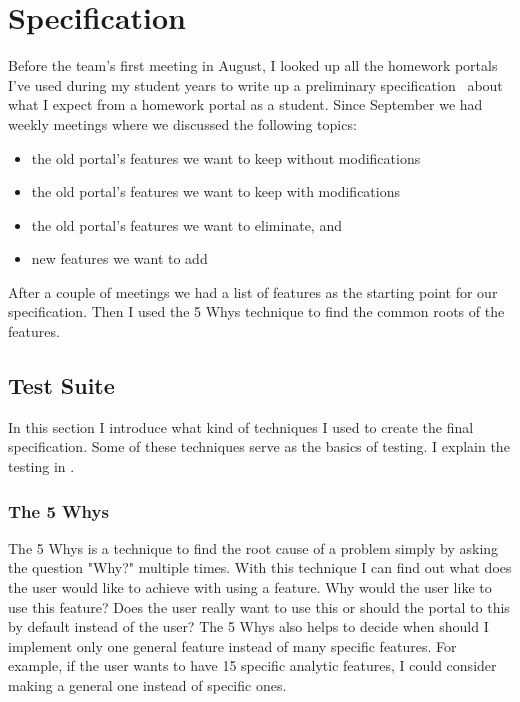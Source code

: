 \chapter{Specification}

Before the team's first meeting in August, I looked up all the homework portals I've used during my student years to write up a preliminary specification~\cite{Szepes-specification} about what I expect from a homework portal as a student. Since September we had weekly meetings where we discussed the following topics: 

\begin{itemize}
	\item the old portal's features we want to keep without modifications
	\item the old portal's features we want to keep with modifications
	\item the old portal's features we want to eliminate, and
	\item new features we want to add
\end{itemize}

After a couple of meetings we had a list of features as the starting point for our specification. Then I used the 5 Whys technique to find the common roots of the features. 

\section{Test Suite}
In this section I introduce what kind of techniques I used to create the final specification. Some of these techniques serve as the basics of testing. I explain the testing in . 

\subsection{The 5 Whys}
\label{5-whys}

The 5 Whys is a technique to find the root cause of a problem simply by asking the question "Why?" multiple times. With this technique I can find out what does the user would like to achieve with using a feature. Why would the user like to use this feature? Does the user really want to use this or should the portal to this by default instead of the user? The 5 Whys also helps to decide when should I implement only one general feature instead of many specific features. For example, if the user wants to have 15 specific analytic features, I could consider making a general one instead of specific ones. 

